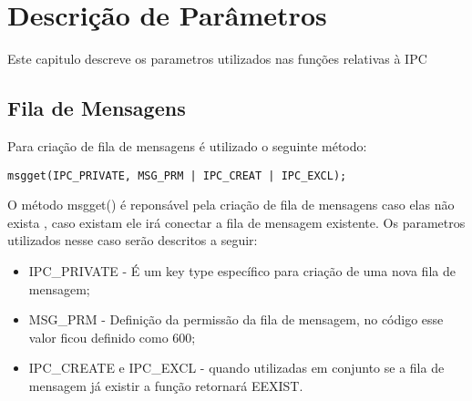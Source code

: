 \chapter{Descrição de Parâmetros}
Este capitulo descreve os parametros utilizados nas funções relativas à IPC
\section{Fila de Mensagens}
Para criação de fila de mensagens é utilizado o seguinte método:
\begin{lstlisting}
msgget(IPC_PRIVATE, MSG_PRM | IPC_CREAT | IPC_EXCL);
\end{lstlisting}

O método msgget() é reponsável pela criação de fila de mensagens caso elas não exista , caso existam ele irá conectar a fila de mensagem existente. Os parametros utilizados nesse caso serão descritos a seguir:

\begin{itemize}
	\item IPC\_PRIVATE - É um key type específico para criação de uma nova fila de mensagem;
    \item MSG\_PRM - Definição da permissão da fila de mensagem, no código esse valor ficou definido como 600;
	\item IPC\_CREATE e IPC\_EXCL - quando utilizadas em conjunto se a fila de mensagem já existir a função retornará EEXIST.  
\end{itemize}